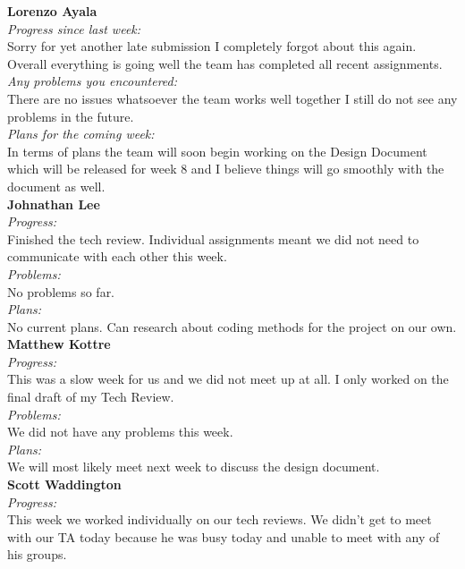 \textbf{Lorenzo Ayala}\\
\noindent\textit{Progress since last week:}\\
Sorry for yet another late submission I completely forgot about this again. Overall everything is going well the team has completed all recent assignments.\\

\noindent\textit{Any problems you encountered:}\\
\noindent There are no issues whatsoever the team works well together I still do not see any problems in the future.\\

\noindent\textit{Plans for the coming week:}\\
\noindent In terms of plans the team will soon begin working on the Design Document which will be released for week 8 and I believe things will go smoothly with the document as well.\\

\noindent\textbf{Johnathan Lee}\\
\noindent\textit{Progress:}\\
Finished the tech review. Individual assignments meant we did not need to communicate with each other this week.\\

\noindent\textit{Problems:}\\
\noindent No problems so far.\\

\noindent\textit{Plans:}\\
\noindent No current plans. Can research about coding methods for the project on our own.\\

\noindent\textbf{Matthew Kottre}\\
\noindent\textit{Progress:}\\
This was a slow week for us and we did not meet up at all. I only worked on the final draft of my Tech Review.\\

\noindent\textit{Problems:}\\
\noindent We did not have any problems this week.\\

\noindent\textit{Plans:}\\
\noindent We will most likely meet next week to discuss the design document.\\

\noindent\textbf{Scott Waddington}\\
\noindent\textit{Progress:}\\
This week we worked individually on our tech reviews. We didn't get to meet with our TA today because he was busy today and unable to meet with any of his groups.\\


